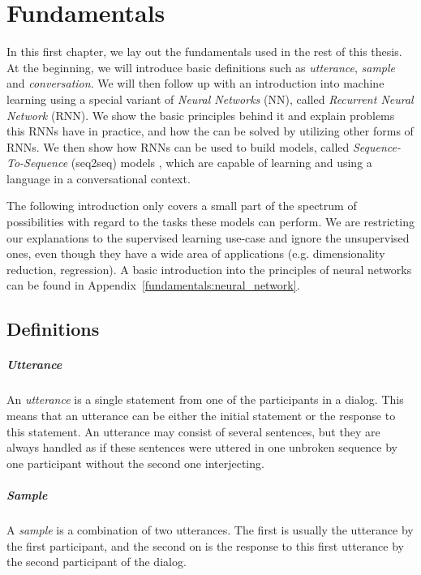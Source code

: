 \chapter{Fundamentals}
\label{chapter:fundamental}
In this first chapter, we lay out the fundamentals used in the rest of this thesis. At the beginning, we will introduce basic definitions such as \emph{utterance}, \emph{sample} and \emph{conversation}. We will then follow up with an introduction into machine learning using a special variant of \emph{Neural Networks} (NN), called \emph{Recurrent Neural Network} (RNN). We show the basic principles behind it and explain problems this RNNs have in practice, and how the can be solved by utilizing other forms of RNNs. We then show how RNNs can be used to build models, called \emph{Sequence-To-Sequence} (seq2seq) models \cite{Sutskever:2014}, which are capable of learning and using a language in a conversational context.

The following introduction only covers a small part of the spectrum of possibilities with regard to the tasks these models can perform. We are restricting our explanations to the supervised learning use-case and ignore the unsupervised ones, even though they have a wide area of applications (e.g. dimensionality reduction, regression). A basic introduction into the principles of neural networks can be found in Appendix~\ref{fundamentals:neural_network}.

\section{Definitions}
\paragraph{Utterance} An \emph{utterance} is a single statement from one of the participants in a dialog. This means that an utterance can be either the initial statement or the response to this statement. An utterance may consist of several sentences, but they are always handled as if these sentences were uttered in one unbroken sequence by one participant without the second one interjecting.
\paragraph{Sample} A \emph{sample} is a combination of two utterances. The first is usually the utterance by the first participant, and the second on is the response to this first utterance by the second participant of the dialog.
